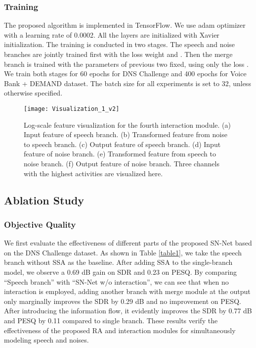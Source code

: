 \documentclass[letterpaper]{article} \usepackage{snnet}  \usepackage{times}  \usepackage{helvet} \usepackage{courier}  \usepackage[hyphens]{url}  \usepackage{graphicx} \urlstyle{rm} \def\UrlFont{\rm}  \usepackage{graphicx}  \usepackage{natbib}  \usepackage{caption} \usepackage{amsfonts}  \usepackage{amsmath}  \usepackage{multirow} \usepackage{tablefootnote}  \usepackage[switch]{lineno}
\begin{document}
\subsubsection{Training}
The proposed algorithm is implemented in TensorFlow. We use adam optimizer with a learning rate of 0.0002. All the layers are initialized with Xavier initialization. The training is conducted in two stages. The speech and noise branches are jointly trained first with the loss weight  and . Then the merge branch is trained with the parameters of previous two fixed, using only the loss . We train both stages for 60 epochs for DNS Challenge and 400 epochs for Voice Bank + DEMAND dataset. The batch size for all experiments is set to 32, unless otherwise specified. 

\begin{figure}[t]
    \centering
    \texttt{[image: Visualization\_1\_v2]}
    \caption{Log-scale feature visualization for the fourth interaction module. (a) Input feature of speech branch. (b) Transformed feature from noise to speech branch. (c) Output feature of speech branch. (d) Input feature of noise branch. (e) Transformed feature from speech to noise branch. (f) Output feature of noise branch. Three channels with the highest activities are visualized here.}
    \label{fig7}
\end{figure}

\subsection{Ablation Study}
\subsubsection{Objective Quality}
We first evaluate the effectiveness of different parts of the proposed SN-Net based on the DNS Challenge dataset. As shown in Table \ref{table1}, we take the speech branch without SSA as the baseline. After adding SSA to the single-branch model, we observe a 0.69 dB gain on SDR and 0.23 on PESQ. By comparing “Speech branch” with “SN-Net w/o interaction”, we can see that when no interaction is employed, adding another branch with merge module at the output only marginally improves the SDR by 0.29 dB and no improvement on PESQ. After introducing the information flow, it evidently improves the SDR by 0.77 dB and PESQ by 0.11 compared to single branch. These results verify the effectiveness of the proposed RA and interaction modules for simultaneously modeling speech and noises.
\end{document}
